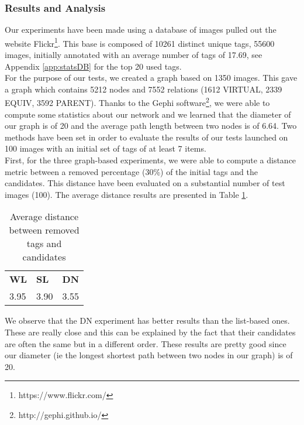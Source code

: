 \subsubsection{Results and Analysis} %
\label{ssub:results_and_analysis}
Our experiments have been made using a database of images pulled out the website Flickr\footnote{https://www.flickr.com/}. This base is composed of 10261 distinct unique tags, 55600 images, initially annotated with an average number of tags of 17.69, see Appendix \ref{app:statsDB} for the top 20 used tags.\\
For the purpose of our tests, we created a graph based on 1350 images. This gave a graph which contains 5212 nodes and 7552 relations (1612 VIRTUAL, 2339 EQUIV, 3592 PARENT). Thanks to the Gephi software\footnote{http://gephi.github.io/}, we were able to compute some statistics about our network and we learned that the diameter of our graph is of 20 and the average path length between two nodes is of 6.64.
Two methods have been set in order to evaluate the results of our tests launched on 100 images with an initial set of tags of at least 7 items.\\

First, for the three graph-based experiments, we were able to compute a distance metric between a removed percentage (30\%) of the initial tags and the candidates. This distance have been evaluated on a substantial number of test images (100). The average distance results are presented in Table \ref{table:avgDist}.
\begin{table}[p]
\centering
\begin{tabular}{lll}
\cline{1-3}
\multicolumn{1}{|l|}{{\bf WL}} & \multicolumn{1}{l|}{{\bf SL}} & \multicolumn{1}{l|}{{\bf DN}} \\ \cline{1-3}
\multicolumn{1}{|l|}{3.95}     & \multicolumn{1}{l|}{3.90}     & \multicolumn{1}{l|}{3.55} \\ \cline{1-3}
\end{tabular}
\caption{Average distance between removed tags and candidates}
\label{table:avgDist}
\end{table}
We observe that the DN experiment has better results than the list-based ones. These are really close and this can be explained by the fact that their candidates are often the same but in a different order. These results are pretty good since our diameter (ie the longest shortest path between two nodes in our graph) is of 20.\\

